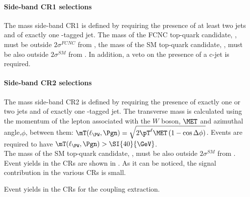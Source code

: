 \paragraph{Side-band CR1 selections}
\label{sec:bkg:sbcr1tzu}
The mass side-band CR1 is defined by requiring the presence of at least two jets
and of exactly one \Pqb-tagged jet.
The mass of the FCNC top-quark candidate, \mtopfcnc,
must be outside $2\sigma^{FCNC}$ from \mtopvalue, the mass of the
SM top-quark candidate, \mtopsm, must be also outside $2\sigma^{SM}$
from \mtopvalue.  In addition, a veto on the presence of a c-jet is required. 

\paragraph{Side-band CR2 selections}
\label{sec:bkg:sbcr2}
The mass side-band CR2 is defined by requiring the presence of exactly one or two jets
and of exactly one \Pqb-tagged jet.   The transverse mass is calculated using the momentum of the lepton associated with the $W$ boson, $\MET$ and azimuthal angle,$\phi$, between them: 
$\mT(\ell_{\PW},\Pgn) = \sqrt{2\pT^{\ell}\MET \left(1-\cos\Delta\phi\right)}$.
Events are required to have $\mT(\ell_{\PW},\Pgn) > \SI{40}{\GeV}$.\\
The mass of the SM top-quark candidate, \mtopsm, must be also outside $2\sigma^{SM}$
from \mtopvalue.\\
Event yields in the CRs are shown in . 
As it can be noticed, the signal contribution in the various CRs is small.
\begin{table}[htbp]
	\small
	\caption{Event yields in the CRs for the \tZc coupling extraction. \TabErrStatSys} 
	\label{tab:bkg:yields:tzc}
	\centering
	
\end{table} 

